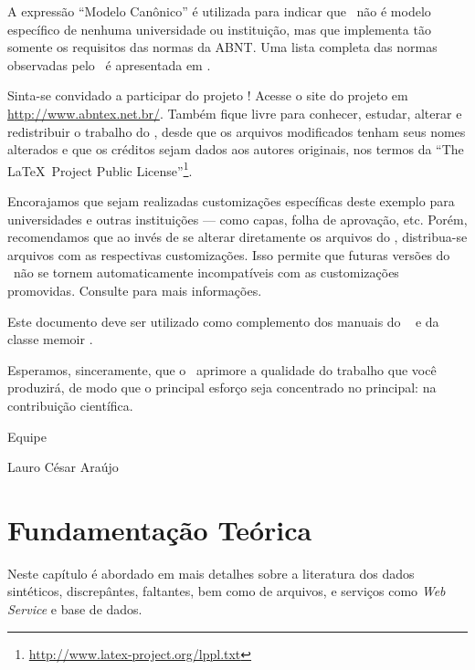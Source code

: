 \documentclass[
	12pt,				%
	openright,			%
	twoside,			%
	a4paper,			%
	english,			%
	brazil				%
	]{abntex2}
\begin{document}
A expressão ``Modelo Canônico'' é utilizada para indicar que \abnTeX\ não é
modelo específico de nenhuma universidade ou instituição, mas que implementa tão
somente os requisitos das normas da ABNT. Uma lista completa das normas
observadas pelo \abnTeX\ é apresentada em \cite{abntex2classe}.

Sinta-se convidado a participar do projeto \abnTeX! Acesse o site do projeto em
\url{http://www.abntex.net.br/}. Também fique livre para conhecer,
estudar, alterar e redistribuir o trabalho do \abnTeX, desde que os arquivos
modificados tenham seus nomes alterados e que os créditos sejam dados aos
autores originais, nos termos da ``The \LaTeX\ Project Public
License''\footnote{\url{http://www.latex-project.org/lppl.txt}}.

Encorajamos que sejam realizadas customizações específicas deste exemplo para
universidades e outras instituições --- como capas, folha de aprovação, etc.
Porém, recomendamos que ao invés de se alterar diretamente os arquivos do
\abnTeX, distribua-se arquivos com as respectivas customizações.
Isso permite que futuras versões do \abnTeX~não se tornem automaticamente
incompatíveis com as customizações promovidas. Consulte
\cite{abntex2-wiki-como-customizar} para mais informações.

Este documento deve ser utilizado como complemento dos manuais do \abnTeX\ 
\cite{abntex2classe,abntex2cite,abntex2cite-alf} e da classe \textsf{memoir}
\cite{memoir}. 

Esperamos, sinceramente, que o \abnTeX\ aprimore a qualidade do trabalho que
você produzirá, de modo que o principal esforço seja concentrado no principal:
na contribuição científica.

Equipe \abnTeX 

Lauro César Araújo


\chapter{Fundamentação Teórica}
	Neste capítulo é abordado em mais detalhes sobre a literatura dos dados sintéticos, discrepântes, faltantes,
	 bem como de arquivos, e serviços como \emph{Web Service} e base de dados.

\end{document}
